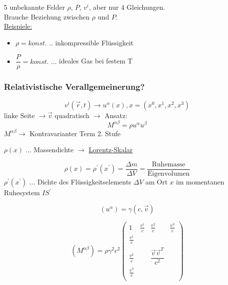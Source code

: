 \documentclass[a4paper, 11pt]{article}
\numberwithin{equation}{section}
\begin{document}
5 unbekannte Felder $\rho$, $P$, $v^i$, aber nur 4 Gleichungen.\\
Brauche Beziehung zwischen $\rho$ und $P$.\\
\underline{Beispiele:} 
\renewcommand{\labelitemi}{}
\begin{itemize}
\item $\rho = konst.$ $..$ inkompressible Flüssigkeit
\item $\dfrac{P}{\rho} = konst.$ $...$ ideales Gas bei festem T 
\end{itemize}

\subsubsection*{Relativistische Verallgemeinerung?}
\begin{equation*}
v^i (\vec{r}, t) \rightarrow u^\alpha(x), x = (x^0, x^1, x^2, x^3)
\end{equation*}
linke Seite $\rightarrow \vec{v}$ quadratisch $\rightarrow$ Ansatz:
\begin{equation}
M^{\alpha \beta} = \rho u^\alpha u^\beta
\end{equation}
$M^{\alpha \beta} \rightarrow$ Kontravarianter Term 2. Stufe 

$\rho(x)$ $...$ Massendichte $\rightarrow$ \underline{Lorentz-Skalar}

\begin{equation*}
\rho(x) = \rho^\prime(x^\prime) = \dfrac{\Delta m}{\Delta V} = \dfrac{\text{Ruhemasse}}{\text{Eigenvolumen}}
\end{equation*}
$\rho^\prime(x^\prime)$ $...$ Dichte des Flüssigkeitselements $\Delta V$ am Ort $x$ im momentanen Ruhesystem $IS^\prime$

\begin{equation}
\left( u^\alpha \right) = \gamma \left( c, \vec{v} \right)
\end{equation}

\begin{equation}
\left( M^{\alpha \beta} \right) = \rho \gamma^2 c^2 \begin{pmatrix}
1 & \frac{v^1}{c} & \frac{v^2}{c} & \frac{v^3}{c} \\
\frac{v^1}{c} \\
\frac{v^2}{c} & & \dfrac{\vec{v}\vec{v}^T}{c^2} \\
\frac{v^3}{c} \\
\end{pmatrix}
\end{equation}
\end{document}
